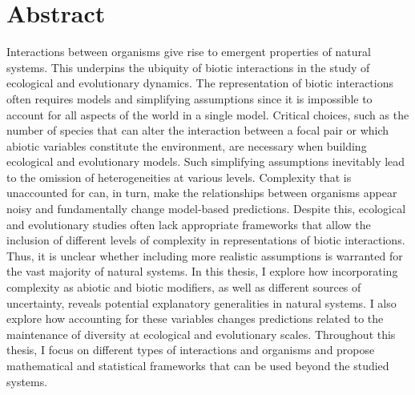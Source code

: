 \chapter*{Abstract}
\small
Interactions between organisms give rise to emergent properties of natural systems. This underpins the ubiquity of biotic interactions in the study of ecological and evolutionary dynamics. The representation of biotic interactions often requires models and simplifying assumptions since it is impossible to account for all aspects of the world in a single model. Critical choices, such as the number of species that can alter the interaction between a focal pair or which abiotic variables constitute the environment, are necessary when building ecological and evolutionary models. Such simplifying assumptions inevitably lead to the omission of heterogeneities at various levels. Complexity that is unaccounted for can, in turn, make the relationships between organisms appear noisy and fundamentally change model-based predictions. Despite this, ecological and evolutionary studies often lack appropriate frameworks that allow the inclusion of different levels of complexity in representations of biotic interactions. Thus, it is unclear whether including more realistic assumptions is warranted for the vast majority of natural systems. In this thesis, I explore how incorporating complexity as abiotic and biotic modifiers, as well as different sources of uncertainty, reveals potential explanatory generalities in natural systems. I also explore how accounting for these variables changes predictions related to the maintenance of diversity at ecological and evolutionary scales. Throughout this thesis, I focus on different types of interactions and organisms and propose mathematical and statistical frameworks that can be used beyond the studied systems.


